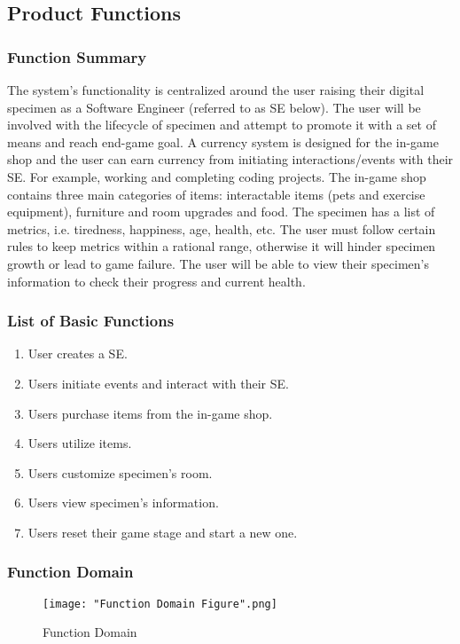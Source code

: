 \documentclass[]{article}
\begin{document}
\subsection{Product Functions}
\label{sub:product_functions}
\subsubsection{Function Summary}
The system’s functionality is centralized around the user raising their digital 
specimen as a Software Engineer (referred to as SE below). The user will be 
involved with the lifecycle of specimen and attempt to promote it with a set 
of means and reach end-game goal. A currency system is designed for the in-game 
shop and the user can earn currency from initiating interactions/events with 
their SE. For example, working and completing coding projects. The in-game 
shop contains three main categories of items: interactable items (pets and 
exercise equipment), furniture and room upgrades and food. The specimen has a 
list of metrics, i.e. tiredness, happiness, age, health, etc. The user must 
follow certain rules to keep metrics within a rational range, otherwise it will 
hinder specimen growth or lead to game failure. The user will be able to view 
their specimen’s information to check their progress and current health. 

\subsubsection{List of Basic Functions}
\begin{enumerate}
    \item User creates a SE.
    \item Users initiate events and interact with their SE.
    \item Users purchase items from the in-game shop.
    \item Users utilize items.
    \item Users customize specimen’s room.
    \item Users view specimen’s information.
    \item Users reset their game stage and start a new one.
\end{enumerate}

\subsubsection{Function Domain}
\begin{figure}[H]
    \centering
    \texttt{[image: "Function Domain Figure".png]}
    \caption{Function Domain}
\end{figure}
\end{document}
